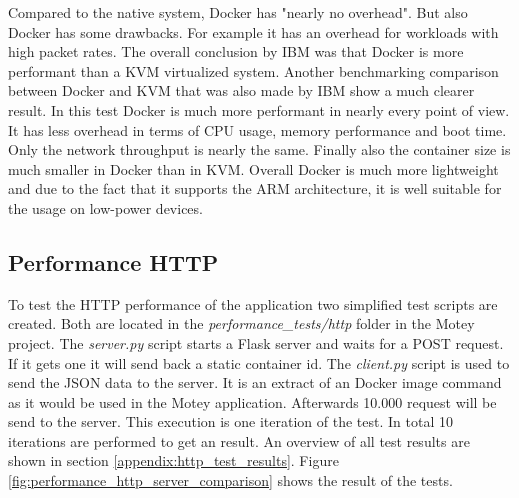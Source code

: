 Compared to the native system, Docker has "nearly no overhead"\autocite[p. 6]{IBM:Performance:2014}.
But also Docker has some drawbacks.
For example it has an overhead for workloads with high packet rates.\autocite[cf.][p. 6]{IBM:Performance:2014}
The overall conclusion by IBM was that Docker is more performant than a \ac{KVM} virtualized system.
\newpage
Another benchmarking comparison\autocite{Russell:Performance:2014} between Docker and \ac{KVM} that was also made by IBM show a much clearer result.
In this test Docker is much more performant in nearly every point of view.
It has less overhead in terms of \ac{CPU} usage\autocite[cf.][p. 25]{Russell:Performance:2014}, memory performance\autocite[cf.][p. 50]{Russell:Performance:2014} and boot time\autocite[cf.][p. 24]{Russell:Performance:2014}.
Only the network throughput is nearly the same.\autocite[cf.][p. 52]{Russell:Performance:2014}
Finally also the container size is much smaller in Docker than in \ac{KVM}.\autocite[cf.][p. 66]{Russell:Performance:2014}
Overall Docker is much more lightweight and due to the fact that it supports the ARM architecture, it is well suitable for the usage on low-power devices.

\subsection{Performance HTTP}
To test the \ac{HTTP} performance of the application two simplified test scripts are created.
Both are located in the \textit{performance\_tests/http} folder in the Motey project.
The \textit{server.py} script starts a Flask server and waits for a POST request.
If it gets one it will send back a static container id.
The \textit{client.py} script is used to send the \ac{JSON} data to the server.
It is an extract of an Docker image command as it would be used in the Motey application.
Afterwards 10.000 request will be send to the server.
This execution is one iteration of the test.
In total 10 iterations are performed to get an result.
An overview of all test results are shown in section \ref{appendix:http_test_results}.
Figure \ref{fig:performance_http_server_comparison} shows the result of the tests.

